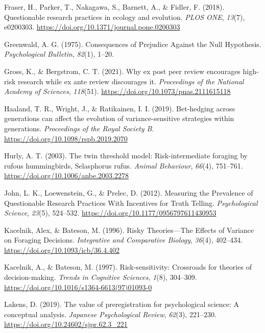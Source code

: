 \documentclass[
  ,man,mask,floatsintext]{apa6}
\newlength{\cslhangindent}
\newlength{\cslentryspacingunit} %
\newenvironment{CSLReferences}[2] %
 {%
  \setlength{\parindent}{0pt}
  \ifodd #1
  \let\oldpar\par
  \def\par{\hangindent=\cslhangindent\oldpar}
  \fi
  \setlength{\parskip}{#2\cslentryspacingunit}
 }%
 {}
\begin{document}
\begin{CSLReferences}{1}{0}
\leavevmode{}%
Fraser, H., Parker, T., Nakagawa, S., Barnett, A., \& Fidler, F. (2018). Questionable research practices in ecology and evolution. \emph{PLOS ONE}, \emph{13}(7), e0200303. \url{https://doi.org/10.1371/journal.pone.0200303}

\leavevmode{}%
Greenwald, A. G. (1975). Consequences of {Prejudice Against} the {Null Hypothesis}. \emph{Psychological Bulletin}, \emph{82}(1), 1--20.

\leavevmode{}%
Gross, K., \& Bergstrom, C. T. (2021). Why ex post peer review encourages high-risk research while ex ante review discourages it. \emph{Proceedings of the National Academy of Sciences}, \emph{118}(51). \url{https://doi.org/10.1073/pnas.2111615118}

\leavevmode{}%
Haaland, T. R., Wright, J., \& Ratikainen, I. I. (2019). Bet-hedging across generations can affect the evolution of variance-sensitive strategies within generations. \emph{Proceedings of the Royal Society B}. \url{https://doi.org/10.1098/rspb.2019.2070}

\leavevmode{}%
Hurly, A. T. (2003). The twin threshold model: Risk-intermediate foraging by rufous hummingbirds, {Selasphorus} rufus. \emph{Animal Behaviour}, \emph{66}(4), 751--761. \url{https://doi.org/10.1006/anbe.2003.2278}

\leavevmode{}%
John, L. K., Loewenstein, G., \& Prelec, D. (2012). Measuring the {Prevalence} of {Questionable Research Practices With Incentives} for {Truth Telling}. \emph{Psychological Science}, \emph{23}(5), 524--532. \url{https://doi.org/10.1177/0956797611430953}

\leavevmode{}%
Kacelnik, Alex, \& Bateson, M. (1996). Risky {Theories}---{The Effects} of {Variance} on {Foraging Decisions}. \emph{Integrative and Comparative Biology}, \emph{36}(4), 402--434. \url{https://doi.org/10.1093/icb/36.4.402}

\leavevmode{}%
Kacelnik, A., \& Bateson, M. (1997). Risk-sensitivity: Crossroads for theories of decision-making. \emph{Trends in Cognitive Sciences}, \emph{1}(8), 304--309. \url{https://doi.org/10.1016/s1364-6613(97)01093-0}

\leavevmode{}%
Lakens, D. (2019). {The value of preregistration for psychological science: A conceptual analysis}. \emph{Japanese Psychological Review}, \emph{62}(3), 221--230. \url{https://doi.org/10.24602/sjpr.62.3_221}


\end{CSLReferences}
\end{document}
